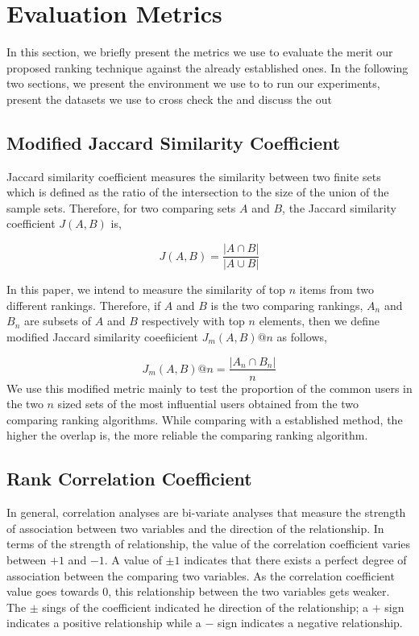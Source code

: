 \documentclass[sigconf]{acmart}
\begin{document}
\section{Evaluation Metrics}
In this section, we briefly present the metrics we use to evaluate the merit our proposed ranking technique against the already established ones. In the following two sections, we present the environment we use to to run our experiments, present the datasets we use to cross check the  and discuss the out 
\subsection{Modified Jaccard Similarity Coefficient}
Jaccard similarity coefficient measures the similarity between two finite sets which is defined as the ratio of the intersection to the size of the union of the sample sets. Therefore, for two comparing sets $A$ and $B$, the Jaccard similarity coefficient $J(A,B)$ is,

\begin{equation}
J(A,B) = \dfrac{|A \cap B|}{|A \cup B|}
\end{equation}

In this paper, we intend to measure the similarity of top $n$ items from two different rankings. Therefore, if $A$ and $B$ is the two comparing rankings, $A_n$ and $B_n$ are subsets of $A$ and $B$ respectively with top $n$ elements, then we define modified Jaccard similarity coeefiicient $J_m(A,B)@n$ as follows,

\begin{equation}
J_m(A,B)@n = \dfrac{|A_n \cap B_n|}{n}
\label{modified jaccard index}
\end{equation}
We use this modified metric mainly to test the proportion of the common users in the two $n$ sized sets of the most influential users obtained from the two comparing ranking algorithms. While comparing with a established method, the higher the overlap is, the more reliable the comparing ranking algorithm.


\subsection{Rank Correlation Coefficient}

In general, correlation analyses are bi-variate analyses that measure the strength of association between two variables and the direction of the relationship. In terms of the strength of relationship, the value of the correlation coefficient varies between $+1$ and $-1$. A value of $\pm 1$ indicates that there exists a perfect degree of association between the comparing two variables. As the correlation coefficient value goes towards $0$, this relationship between the two variables gets weaker. The $\pm$ sings of the coefficient indicated he direction of the relationship; a $+$ sign indicates a positive relationship while a $-$ sign indicates a negative relationship.
\end{document}
